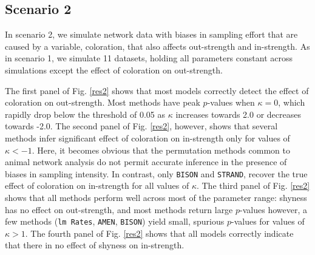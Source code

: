 \documentclass[Afour,sageh,times]{sagej}
\begin{document}
\subsection{Scenario 2}
In scenario 2, we simulate network data with biases in sampling effort that are caused by a variable, coloration, that also affects out-strength and in-strength.  As in scenario 1, we simulate 11 datasets, holding all parameters constant across simulations except the effect of coloration on out-strength. 

The first panel of Fig. \ref{res2} shows that most models correctly detect the effect of coloration on out-strength. Most methods have peak $p$-values when $\kappa=0$, which rapidly drop below the threshold of 0.05 as $\kappa$ increases towards 2.0 or decreases towards -2.0. The second panel of Fig. \ref{res2}, however, shows that several methods infer significant effect of coloration on in-strength only for values of $\kappa<-1$. Here, it becomes obvious that the permutation methods common to animal network analysis do not permit accurate inference in the presence of biases in sampling intensity. In contrast, only \texttt{BISON} and \texttt{STRAND}, recover the true effect of coloration on in-strength for all values of $\kappa$. The third panel of Fig. \ref{res2} shows that all methods perform well across most of the parameter range: shyness has no effect on out-strength, and most methods return large $p$-values however, a few methods (\texttt{lm Rates}, \texttt{AMEN}, \texttt{BISON}) yield small, spurious $p$-values for values of $\kappa>1$. The fourth panel of Fig. \ref{res2} shows that all models correctly indicate that there in no effect of shyness on in-strength.
\end{document}
